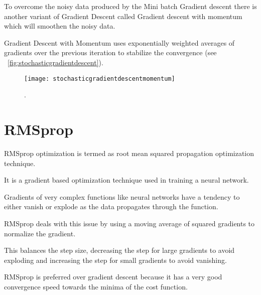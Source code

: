 	\begin{bulletedlist}
		\item To overcome the noisy data produced by the Mini batch Gradient descent there is another variant of Gradient Descent called Gradient descent with momentum which will smoothen the noisy data.
		\item Gradient Descent with Momentum uses exponentially weighted averages of gradients over the previous iteration to stabilize the convergence (see \figurename~\ref{fig:stochasticgradientdescent}).
	\end{bulletedlist}
 	\begin{figure}[h]
		\centering
		\texttt{[image: stochasticgradientdescentmomentum]}
		\caption{.}
		\label{fig:stochasticgradientdescentmomentum}
	\end{figure}


	\section{RMSprop}

	\begin{bulletedlist}
		\item RMSprop optimization is termed as root mean squared propagation optimization technique.
		\item It is a gradient based optimization technique used in training a neural network.
		\item Gradients of very complex functions like neural networks have a tendency to either vanish or explode as the data propagates through the function.
		\item RMSprop deals with this issue by using a moving average of squared gradients to normalize the gradient.
		\item This balances the step size, decreasing the step for large gradients to avoid exploding and increasing the step for small gradients to avoid vanishing.
		\item RMSprop is preferred over gradient descent because it has a very good convergence speed towards the minima of the cost function.
	\end{bulletedlist}

